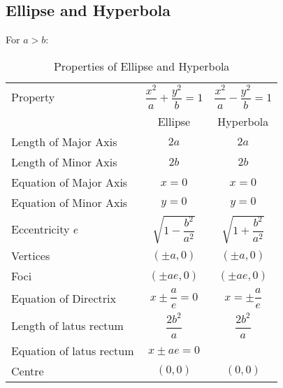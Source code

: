 \documentclass[../main.tex]{subfile}
\begin{document}
    \subsection{Ellipse and Hyperbola}
    For $a>b$:
    \begin{table}[h!]
        \begin{center}
            \caption{Properties of Ellipse and Hyperbola}
            \label{ell&hyp}
            \begin{tabular}{l|c|c}
                Property&$\dfrac{x^2}{a}+\dfrac{y^2}{b}=1$&$\dfrac{x^2}{a}-\dfrac{y^2}{b}=1$\\
                &Ellipse&Hyperbola\\
                \hline
                Length of Major Axis&$2a$&$2a$\\
                Length of Minor Axis&$2b$&$2b$\\
                Equation of Major Axis&$x=0$&$x=0$\\
                Equation of Minor Axis&$y=0$&$y=0$\\
                Eccentricity $e$&$\sqrt{1-\dfrac{b^2}{a^2}}$&$\sqrt{1+\dfrac{b^2}{a^2}}$\\
                Vertices&$(\pm a,0)$&$(\pm a,0)$\\
                Foci&$(\pm ae,0)$&$(\pm ae,0)$\\
                Equation of Directrix&$x \pm \dfrac{a}{e}=0$ &$x=\pm\dfrac{a}{e}$\\
                Length of latus rectum&$\dfrac{2b^2}{a}$&$\dfrac{2b^2}{a}$\\
                Equation of latus rectum&$x \pm ae=0$& \\
                Centre&$(0,0)$&$(0,0)$
            \end{tabular}
        \end{center}
    \end{table}

\end{document}
